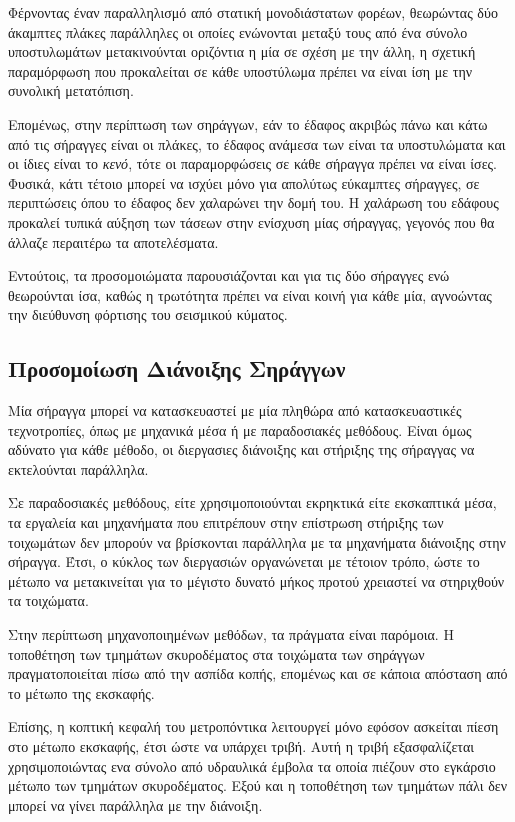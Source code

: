 Φέρνοντας έναν παραλληλισμό από στατική μονοδιάστατων φορέων, θεωρώντας δύο άκαμπτες πλάκες παράλληλες οι οποίες ενώνονται μεταξύ τους από ένα σύνολο υποστυλωμάτων μετακινούνται οριζόντια η μία σε σχέση με την άλλη, η σχετική παραμόρφωση που προκαλείται σε κάθε υποστύλωμα πρέπει να είναι ίση με την συνολική μετατόπιση.

Επομένως, στην περίπτωση των σηράγγων, εάν το έδαφος ακριβώς πάνω και κάτω από τις σήραγγες είναι οι πλάκες, το έδαφος ανάμεσα των είναι τα υποστυλώματα και οι ίδιες είναι το \textit{κενό}, τότε οι παραμορφώσεις σε κάθε σήραγγα πρέπει να είναι ίσες. Φυσικά, κάτι τέτοιο μπορεί να ισχύει μόνο για απολύτως εύκαμπτες σήραγγες, σε περιπτώσεις όπου το έδαφος δεν χαλαρώνει την δομή του. Η χαλάρωση του εδάφους προκαλεί τυπικά αύξηση των τάσεων στην ενίσχυση μίας σήραγγας, γεγονός που θα άλλαζε περαιτέρω τα αποτελέσματα.

Εντούτοις, τα προσομοιώματα παρουσιάζονται και για τις δύο σήραγγες ενώ θεωρούνται ίσα, καθώς η τρωτότητα πρέπει να είναι κοινή για κάθε μία, αγνοώντας την διεύθυνση φόρτισης του σεισμικού κύματος.
\subsection{Προσομοίωση Διάνοιξης Σηράγγων}
\label{sbs:tun}
Μία σήραγγα μπορεί να κατασκευαστεί με μία πληθώρα από κατασκευαστικές τεχνοτροπίες, όπως με μηχανικά μέσα ή με παραδοσιακές μεθόδους. Είναι όμως αδύνατο για κάθε μέθοδο, οι διεργασιες διάνοιξης και στήριξης της σήραγγας να εκτελούνται παράλληλα.

Σε παραδοσιακές μεθόδους, είτε χρησιμοποιούνται εκρηκτικά είτε εκσκαπτικά μέσα, τα εργαλεία και μηχανήματα που επιτρέπουν στην επίστρωση στήριξης των τοιχωμάτων δεν μπορούν να βρίσκονται παράλληλα με τα μηχανήματα διάνοιξης στην σήραγγα. Έτσι, ο κύκλος των διεργασιών οργανώνεται με τέτοιον τρόπο, ώστε το μέτωπο να μετακινείται για το μέγιστο δυνατό μήκος προτού χρειαστεί να στηριχθούν τα τοιχώματα.

Στην περίπτωση μηχανοποιημένων μεθόδων, τα πράγματα είναι παρόμοια. Η τοποθέτηση των τμημάτων σκυροδέματος στα τοιχώματα των σηράγγων πραγματοποιείται πίσω από την ασπίδα κοπής, επομένως και σε κάποια απόσταση από το μέτωπο της εκσκαφής.

Επίσης, η κοπτική κεφαλή του μετροπόντικα λειτουργεί μόνο εφόσον ασκείται πίεση στο μέτωπο εκσκαφής, έτσι ώστε να υπάρχει τριβή. Αυτή η τριβή εξασφαλίζεται χρησιμοποιώντας ενα σύνολο από υδραυλικά έμβολα τα οποία πιέζουν στο εγκάρσιο μέτωπο των τμημάτων σκυροδέματος. Εξού και η τοποθέτηση των τμημάτων πάλι δεν μπορεί να γίνει παράλληλα με την διάνοιξη.

